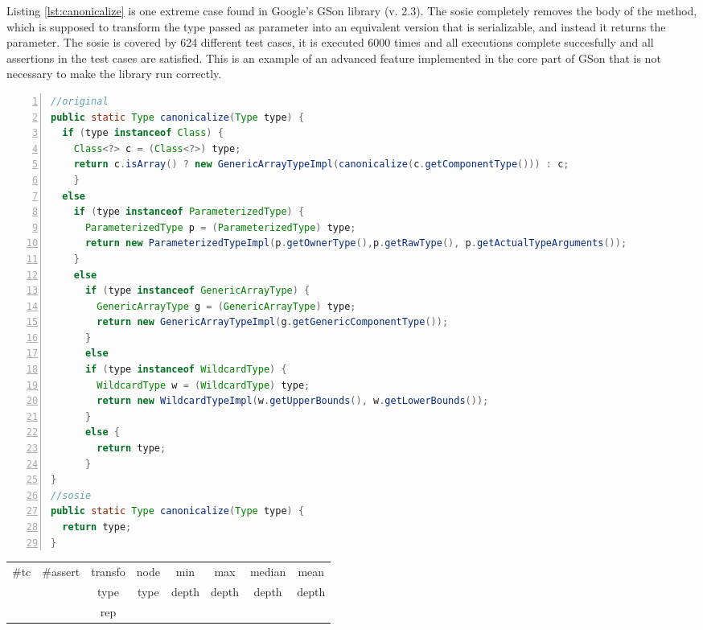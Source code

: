 Listing \ref{lst:canonicalize} is one extreme case found in Google's GSon library (v. 2.3). 
The sosie completely removes the body of the method, which is supposed to transform the type passed as parameter into an equivalent version that is serializable, and instead it returns the parameter. 
The sosie is covered by 624 different test cases, it is executed 6000 times and all executions complete succesfully and all assertions in the test cases are satisfied. 
This is an example of an advanced feature implemented in the core part of GSon that is not necessary to make the library run correctly.

\begin{minipage}{\columnwidth}
\begin{lstlisting}[caption={\texttt{canonicalize} in EasyMock and a sosie},label={lst:canonicalize},language=java,numbers=left]
//original
public static Type canonicalize(Type type) {
  if (type instanceof Class) {
    Class<?> c = (Class<?>) type;
    return c.isArray() ? new GenericArrayTypeImpl(canonicalize(c.getComponentType())) : c;
    } 
  else 
    if (type instanceof ParameterizedType) {
      ParameterizedType p = (ParameterizedType) type;
      return new ParameterizedTypeImpl(p.getOwnerType(),p.getRawType(), p.getActualTypeArguments());
    } 
    else 
      if (type instanceof GenericArrayType) {
        GenericArrayType g = (GenericArrayType) type;
        return new GenericArrayTypeImpl(g.getGenericComponentType());
      } 
      else 
      if (type instanceof WildcardType) {
        WildcardType w = (WildcardType) type;
        return new WildcardTypeImpl(w.getUpperBounds(), w.getLowerBounds());
      } 
      else {
        return type;
      }
}
//sosie
public static Type canonicalize(Type type) {
  return type;
}
\end{lstlisting}
\tabcolsep=0.11cm
\begin{tabular}{>{\small}c>{\small}c>{\small}c>{\small}c>{\small}c>{\small}c>{\small}c>{\small}c}
\hline
\rowcolor{lightgray} \#tc & \#assert & transfo & node & min & max & median & mean   \\
\rowcolor{lightgray}  & & type & type & depth  & depth & depth & depth  \\ 
\hline
&  & rep &  &  &  &  & \\
\hline
\end{tabular}
\end{minipage}